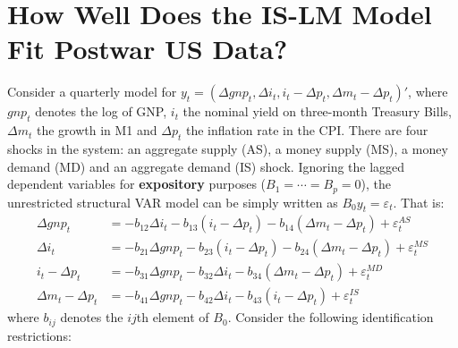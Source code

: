 \section[How Well Does the IS-LM Model Fit Postwar US Data]{How Well Does the IS-LM Model Fit Postwar US Data?\label{ex:svarISLM}}
Consider a quarterly model for \(y_t = (\Delta gnp_t, \Delta i_t, i_t-\Delta p_t, \Delta m_t - \Delta p_t)'\),
  where \(gnp_t\) denotes the log of GNP, \(i_t\) the nominal yield on three-month Treasury Bills,
  \(\Delta m_t\) the growth in M1 and \(\Delta p_t\) the inflation rate in the CPI\@.
There are four shocks in the system: an aggregate supply (AS), a money supply (MS), a money demand (MD) and an aggregate demand (IS) shock.
Ignoring the lagged dependent variables for \textbf{expository} purposes (\(B_1=\cdots =B_p=0\)),
  the unrestricted structural VAR model can be simply written as \(B_{0} y_t = \varepsilon_t\).
That is:
\begin{align}
\Delta gnp_t &= -b_{12}\Delta i_t -b_{13}(i_t-\Delta p_t) -b_{14}(\Delta m_t-\Delta p_t) + \varepsilon_t^{AS} \label{eq:AS}\\
\Delta i_t &= -b_{21}\Delta gnp_t -b_{23}(i_t-\Delta p_t) -b_{24}(\Delta m_t-\Delta p_t) + \varepsilon_t^{MS} \label{eq:MS}\\
i_t - \Delta p_t &= -b_{31}\Delta gnp_t -b_{32}\Delta i_t -b_{34}(\Delta m_t-\Delta p_t) + \varepsilon_t^{MD} \label{eq:MD}\\
\Delta m_t - \Delta p_t &= -b_{41}\Delta gnp_t -b_{42}\Delta i_t - b_{43} (i_t-\Delta p_t) + \varepsilon_t^{IS} \label{eq:IS}
\end{align}
where \(b_{ij}\) denotes the \(ij\)th element of \(B_{0}\).
Consider the following identification restrictions:

